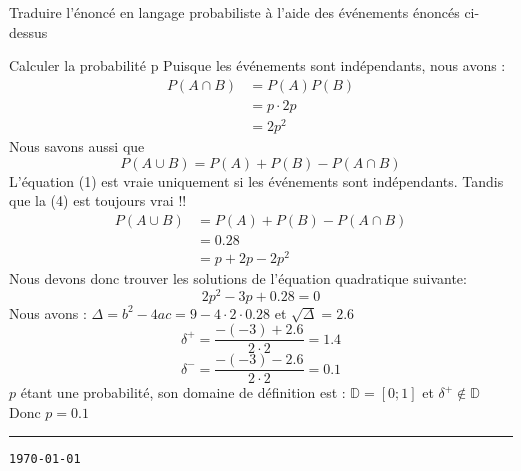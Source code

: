 \begin{exo}
\begin{subexo}{Traduire l'énoncé en langage probabiliste à l'aide des événements énoncés ci-dessus}
		\end{subexo}
		\begin{subexo}{Calculer la probabilité p}
			Puisque les événements sont indépendants, nous avons : 
					\begin{align}
						P(A \cap B) &= P(A) P(B)\\
				&= p \cdot 2p\\
				&= 2p^2
					\end{align}
				Nous savons aussi que
					\begin{equation}
						P(A \cup B) = P(A) + P(B) -P(A \cap B)
					\end{equation}
					L'équation (1) est vraie uniquement si les événements sont indépendants. Tandis que la (4) est toujours vrai !! 
					\begin{align}
						P(A \cup B) &= P(A) + P(B) -P(A \cap B)\\
						 &= 0.28\\
						 &= p + 2p - 2p^2
					\end{align}
					Nous devons donc trouver les solutions de l'équation quadratique suivante:
					$$2p^2 - 3p + 0.28 = 0$$
						Nous avons : $\Delta = b^2 -4ac = 9 -4\cdot 2\cdot 0.28$\newline
						 et $\sqrt{\Delta} = 2.6$
						 $$\delta^+ = \frac{-(-3) + 2.6}{2\cdot2} = 1.4$$
						 $$\delta^- = \frac{-(-3) - 2.6}{2\cdot2} = 0.1$$
						$p$ étant une probabilité, son domaine de définition est : $\mathbb{D} = [0;1]$ et $\delta^+ \notin \mathbb{D}$ 
						Donc $p = 0.1$
		\end{subexo}
	\end{exo}
	
	
	
	
	\vfill
	\hrule
	\vspace{2mm}
	 \hfill {\tt \tiny \today}

